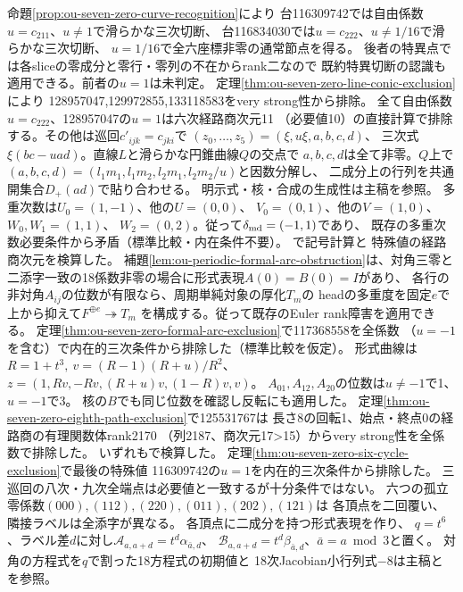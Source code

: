 \documentclass[11pt,a4paper]{ltjsarticle}
\begin{document}
命題\ref{prop:ou-seven-zero-curve-recognition}により
台116309742では自由係数$u=c_{211}$、$u\ne1$で滑らかな三次切断、
台116834030では$u=c_{222}$、$u\ne1/16$で滑らかな三次切断、
$u=1/16$で全六座標非零の通常節点を得る。
後者の特異点では各sliceの零成分と零行・零列の不在からrank二なので
既約特異切断の認識も適用できる。前者の$u=1$は未判定。
定理\ref{thm:ou-seven-zero-line-conic-exclusion}により
128957047,129972855,133118583をvery strong性から排除。
全て自由係数$u=c_{222}$、128957047の$u=1$は六次経路商次元11
（必要値10）の直接計算で排除する。その他は巡回$c'_{ijk}=c_{jki}$で
$(z_0,\ldots,z_5)=(\xi,u\xi,a,b,c,d)$、
三次式$\xi(bc-uad)$。直線$L$と滑らかな円錐曲線$Q$の交点で
$a,b,c,d$は全て非零。$Q$上で
$(a,b,c,d)=(l_1m_1,l_1m_2,l_2m_1,l_2m_2/u)$と因数分解し、
二成分上の行列を共通開集合$D_+(ad)$で貼り合わせる。
明示式・核・合成の生成性は主稿を参照。
多重次数は$U_0=(1,-1)$、他の$U=(0,0)$、
$V_0=(0,1)$、他の$V=(1,0)$、$W_0,W_1=(1,1)$、
$W_2=(0,2)$。従って$\delta_{\rm md}=(-1,1)$であり、
既存の多重次数必要条件から矛盾（標準比較・内在条件不要）。
で記号計算と
特殊値の経路商次元を検算した。
補題\ref{lem:ou-periodic-formal-arc-obstruction}は、対角三零と
二添字一致の18係数非零の場合に形式表現$A(0)=B(0)=I$があり、
各行の非対角$A_{ij}$の位数が有限なら、周期単純対象の厚化$T_m$の
headの多重度を固定$e$で上から抑えて$F^{\oplus e}\twoheadrightarrow T_m$
を構成する。従って既存のEuler rank障害を適用できる。
定理\ref{thm:ou-seven-zero-formal-arc-exclusion}で117368558を全係数
（$u=-1$を含む）で内在的三次条件から排除した（標準比較を仮定）。
形式曲線は$R=1+t^3,\ v=(R-1)(R+u)/R^2$、
$z=(1,Rv,-Rv,(R+u)v,(1-R)v,v)$。
$A_{01},A_{12},A_{20}$の位数は$u\ne-1$で1、$u=-1$で3。
核の$B$でも同じ位数を確認し反転にも適用した。
定理\ref{thm:ou-seven-zero-eighth-path-exclusion}で125531767は
長さ8の回転1、始点・終点0の経路商の有理関数体rank2170
（列2187、商次元17>15）からvery strong性を全係数で排除した。
いずれもで検算した。
定理\ref{thm:ou-seven-zero-six-cycle-exclusion}で最後の特殊値
116309742の$u=1$を内在的三次条件から排除した。
三巡回の八次・九次全端点は必要値と一致するが十分条件ではない。
六つの孤立零係数$(000),(112),(220),(011),(202),(121)$は
各頂点を二回覆い、隣接ラベルは全添字が異なる。
各頂点に二成分を持つ形式表現を作り、
$q=t^6$、ラベル差$d$に対し$\mathcal A_{a,a+d}=t^d\alpha_{\bar a,d}$、
$\mathcal B_{a,a+d}=t^d\beta_{\bar a,d}$、$\bar a=a\bmod3$と置く。
対角の方程式を$q$で割った18方程式の初期値と
18次Jacobian小行列式$-8$は主稿と
を参照。
\end{document}
